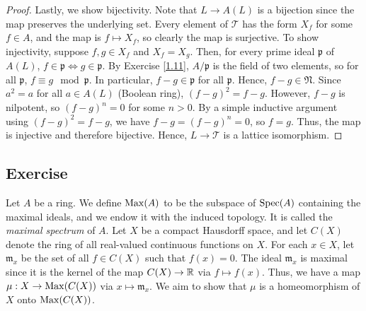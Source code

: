 \begin{proof}
Lastly, we show bijectivity. Note that $L \to A(L)$ is a bijection since the map preserves the underlying set. Every element of $\mathcal{T}$ has the form $X_f$ for some $f \in A$, and the map is $f \mapsto X_f$,
so clearly the map is surjective. To show injectivity, suppose $f,g \in X_f$ and $X_f = X_g$. Then, for every prime ideal $\mathfrak{p}$ of $A(L)$, $f \in \mathfrak{p} \iff g \in \mathfrak{p}$. By Exercise \ref{1.11},
$A/\mathfrak{p}$ is the field of two elements, so for all $\mathfrak{p}$, $f \equiv g \mod \mathfrak{p}$. In particular, $f-g \in \mathfrak{p}$ for all $\mathfrak{p}$. Hence, $f-g \in \mathfrak{N}$. Since
$a^2 = a$ for all $a \in A(L)$ (Boolean ring), $(f-g)^2 = f-g$. However, $f-g$ is nilpotent, so $(f-g)^n = 0$ for some $n > 0$. By a simple inductive argument using $(f-g)^2 = f-g$, we have $f-g = (f-g)^n = 0$,
so $f = g$. Thus, the map is injective and therefore bijective. Hence, $L \to \mathcal{T}$ is a lattice isomorphism.
\end{proof}

\subsection{Exercise}\label{1.26}

Let $A$ be a ring. We define $\operatorname{Max}(A)$ to be the subspace of $\operatorname{Spec}(A)$ containing the maximal ideals, and we endow it with the induced topology. It is called the {\it maximal spectrum} of $A$. Let
$X$ be a compact Hausdorff space, and let $C(X)$ denote the ring of all real-valued continuous functions on $X$. For each $x \in X$, let $\mathfrak{m}_x$ be the set of all $f \in C(X)$ such that
$f(x) = 0$. The ideal $\mathfrak{m}_x$ is maximal since it is the kernel of the map $C(X) \to \mathbb{R}$ via $f \mapsto f(x)$. Thus, we have a map $\mu : X \to \operatorname{Max}(C(X))$ via $x \mapsto \mathfrak{m}_x$. We aim
to show that $\mu$ is a homeomorphism of $X$ onto $\operatorname{Max}(C(X))$.

